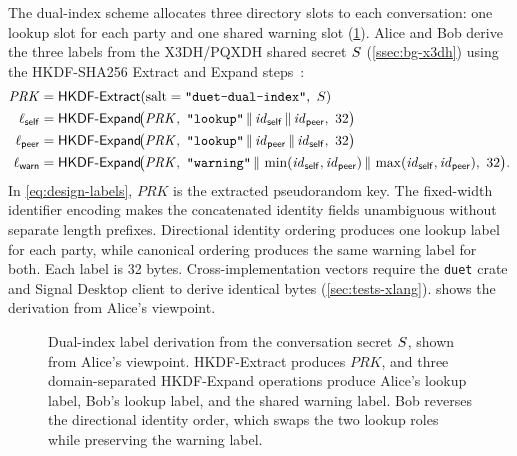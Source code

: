 The dual-index scheme allocates three directory slots to each conversation: one lookup slot for each
party and one shared warning slot (\cref{fig:design-dualindex}). Alice and Bob derive the three
labels from the X3DH/PQXDH shared secret $S$ (\cref{ssec:bg-x3dh}) using the HKDF-SHA256
Extract and Expand steps~\cite[Sections~2.2--2.3]{rfc5869}:
\begin{equation}\label{eq:design-labels}
\begin{aligned}
  \mathit{PRK} &= \HKDFex(\text{salt} = \text{\texttt{"duet-dual-index"}},\ \sharedS)\\
  \ell_{\mathsf{self}} &= \HKDFexp\!\big(\mathit{PRK},\ \text{\texttt{"lookup"}} \concat \mathit{id}_{\mathsf{self}} \concat \mathit{id}_{\mathsf{peer}},\ 32\big)\\
  \ell_{\mathsf{peer}} &= \HKDFexp\!\big(\mathit{PRK},\ \text{\texttt{"lookup"}} \concat \mathit{id}_{\mathsf{peer}} \concat \mathit{id}_{\mathsf{self}},\ 32\big)\\
  \ell_{\mathsf{warn}} &= \HKDFexp\!\big(\mathit{PRK},\ \text{\texttt{"warning"}} \concat \min(\mathit{id}_{\mathsf{self}}, \mathit{id}_{\mathsf{peer}}) \concat \max(\mathit{id}_{\mathsf{self}}, \mathit{id}_{\mathsf{peer}}),\ 32\big).
\end{aligned}
\end{equation}
In \cref{eq:design-labels}, $\mathit{PRK}$ is the extracted pseudorandom key. The fixed-width
identifier encoding makes the concatenated identity fields unambiguous without separate length
prefixes. Directional identity ordering produces one lookup label for each party, while canonical
ordering produces the same warning label for both. Each label is 32 bytes. Cross-implementation
vectors require the \texttt{duet} crate and Signal Desktop client to derive identical bytes
(\cref{sec:tests-xlang}).  shows the derivation from Alice's viewpoint.

\begin{figure}[ht]
\centering

\caption[The dual-index scheme's three derived slots.]{Dual-index label derivation from the
conversation secret $S$, shown from Alice's viewpoint. HKDF-Extract produces
$\mathit{PRK}$, and three domain-separated HKDF-Expand operations produce Alice's lookup label,
Bob's lookup label, and the shared warning label. Bob reverses the directional identity order,
which swaps the two lookup roles while preserving the warning label.}
\label{fig:design-dualindex}
\end{figure}
\FloatBarrier

